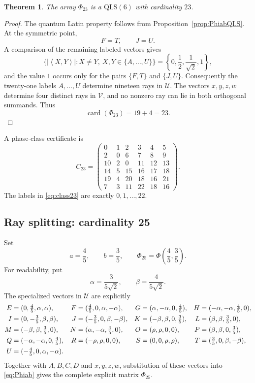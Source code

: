 \documentclass[11pt,a4paper]{article}
\newcommand{\QLS}{\mathrm{QLS}}
\newcommand{\card}{\operatorname{card}}
\newcommand{\ip}[2]{\left\langle #1,#2\right\rangle}
\newtheorem{theorem}{Theorem}
\begin{document}
\begin{theorem}\label{thm:c23}
The array $\Phi_{23}$ is a $\QLS(6)$ with cardinality $23$.
\end{theorem}

\begin{proof}
The quantum Latin property follows from Proposition~\ref{prop:PhiabQLS}.
At the symmetric point,
\[
 F=T,
 \qquad
 J=U.
\]
A comparison of the remaining labeled vectors gives
\[
 \bigl\{|\ip{X}{Y}|:X\neq Y,\ X,Y\in\{A,\ldots,U\}\bigr\}
 =\left\{0,\frac12,\frac1{\sqrt2},1\right\},
\]
and the value $1$ occurs only for the pairs $\{F,T\}$ and $\{J,U\}$.
Consequently the twenty-one labels $A,\ldots,U$ determine nineteen rays in
$\mathcal U$.  The vectors $x,y,z,w$ determine four distinct rays in
$\mathcal V$, and no nonzero ray can lie in both orthogonal summands.  Thus
\[
 \card(\Phi_{23})=19+4=23.
\]
\end{proof}

A phase-class certificate is
\begin{equation}\label{eq:class23}
C_{23}=
\begin{pmatrix}
0&1&2&3&4&5\\
2&0&6&7&8&9\\
10&2&0&11&12&13\\
14&5&15&16&17&18\\
19&4&20&18&16&21\\
7&3&11&22&18&16
\end{pmatrix}.
\end{equation}
The labels in \eqref{eq:class23} are exactly $0,1,\ldots,22$.

\subsection{Ray splitting: cardinality 25}

Set
\[
 a=\frac45,
 \qquad
 b=\frac35,
 \qquad
 \Phi_{25}=\Phi\left(\frac45,\frac35\right).
\]
For readability, put
\[
 \alpha=\frac{3}{5\sqrt2},
 \qquad
 \beta=\frac{4}{5\sqrt2}.
\]
The specialized vectors in $\mathcal U$ are explicitly
\begin{align}
E&=(0,\tfrac45,\alpha,\alpha),&
F&=(\tfrac45,0,\alpha,-\alpha),&
G&=(\alpha,-\alpha,0,\tfrac45),&
H&=(-\alpha,-\alpha,\tfrac45,0),\notag\\
I&=(0,-\tfrac35,\beta,\beta),&
J&=(-\tfrac35,0,\beta,-\beta),&
K&=(-\beta,\beta,0,\tfrac35),&
L&=(\beta,\beta,\tfrac35,0),\notag\\
M&=(-\beta,\beta,\tfrac35,0),&
N&=(\alpha,-\alpha,\tfrac45,0),&
O&=(\rho,\rho,0,0),&
P&=(\beta,\beta,0,\tfrac35),\notag\\
Q&=(-\alpha,-\alpha,0,\tfrac45),&
R&=(-\rho,\rho,0,0),&
S&=(0,0,\rho,\rho),&
T&=(\tfrac35,0,\beta,-\beta),\notag\\
U&=(-\tfrac45,0,\alpha,-\alpha).
\label{eq:explicit25vectors}
\end{align}
Together with $A,B,C,D$ and $x,y,z,w$, substitution of these vectors into
\eqref{eq:Phiab} gives the complete explicit matrix $\Phi_{25}$.
\end{document}
